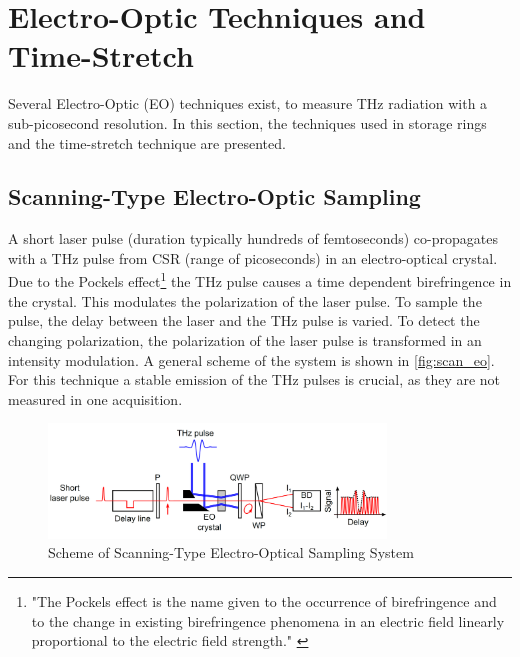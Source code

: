 \newpage 
\section{Electro-Optic Techniques and Time-Stretch}
Several Electro-Optic (EO) techniques exist, to measure THz radiation  with a sub-picosecond resolution. In this section, the techniques used in storage rings and the time-stretch technique are presented. 

\subsection{Scanning-Type Electro-Optic Sampling}
A short laser pulse (duration typically hundreds of femtoseconds) co-propagates with a THz pulse from CSR (range of picoseconds) in an electro-optical crystal. Due to the Pockels effect\footnote{"The Pockels effect is the name given to the occurrence of
birefringence and to the change in existing birefringence phenomena in an electric field linearly proportional to the electric
field strength." \cite{pockels}} the THz pulse causes a time dependent birefringence in the crystal. This modulates the polarization of the laser pulse. To sample the pulse, the delay between the laser and the THz pulse is varied. To detect the changing polarization, the polarization of the laser pulse is transformed in an intensity modulation. A general scheme of the system is shown in \autoref{fig:scan_eo}. For this technique a stable emission of the THz pulses is crucial, as they are not measured in one acquisition. \cite{roussel2014}
\begin{figure}[H]
	\centering
	\includegraphics[width = 0.8\textwidth]{chap/02-theory/img/scanning_eo}
	\caption{Scheme of Scanning-Type Electro-Optical Sampling System \cite{roussel2014}}
	\label{fig:scan_eo}
\end{figure}

